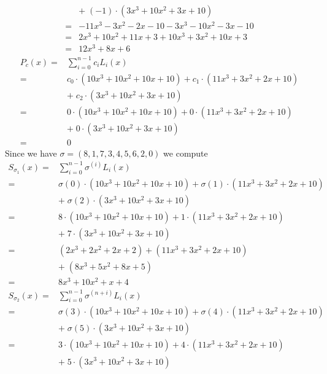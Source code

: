 \begin{example}
$$\begin{array}{rl}
           & +\; (-1)\cdot (3x^3 +10x^2+ 3x + 10)\\
         = & -11x^3 -3x^2 -2x - 10 -3x^3 -10x^2 -3x -10\\  
         = & 2x^3 +10 x^2 +11x +3 +10x^3 +3x^2 +10x +3\\ 
         = & 12x^3  +8x +6           
\end{array}
$$
$$
\begin{array}{rl}
P_{c}(x) = & \sum_{i=0}^{n-1} {c_i}L_i(x)\\         
         = & c_0\cdot (10x^3 + 10 x^2 +10x + 10) + c_1\cdot (11x^3 +3x^2 +2x + 10) \\
           & +\; c_2\cdot (3x^3 +10x^2+ 3x + 10)\\
         = & 0\cdot (10x^3 + 10 x^2 +10x + 10) + 0\cdot (11x^3 +3x^2 +2x + 10) \\
           & +\; 0\cdot (3x^3 +10x^2+ 3x + 10)\\
         = & 0          
\end{array}
$$
Since we have $\sigma = (8,1,7,3,4,5,6,2,0)$ we compute
$$
\begin{array}{rl}
S_{\sigma_1}(x) = & \sum_{i=0}^{n-1} \sigma^(i)L_i(x) \\       
         = & \sigma(0) \cdot (10x^3 + 10 x^2 +10x + 10) 
           + \sigma(1)\cdot (11x^3 +3x^2 +2x + 10) \\
           & +\; \sigma(2)\cdot (3x^3 +10x^2+ 3x + 10)\\
         = & 8 \cdot (10x^3 + 10 x^2 +10x + 10) 
           + 1\cdot (11x^3 +3x^2 +2x + 10) \\
           & +\; 7 \cdot (3x^3 +10x^2+ 3x + 10)\\ 
         = & (2x^3 + 2 x^2 +2x + 2) 
           + (11x^3 +3x^2 +2x + 10) \\
           & +\; (8x^3 +5x^2+ 8x + 5)\\ 
         = & 8x^3 + 10 x^2 + x + 4                     
\end{array}
$$
$$
\begin{array}{rl}
S_{\sigma_2}(x) = & \sum_{i=0}^{n-1} \sigma^(n+i)L_i(x) \\       
         = & \sigma(3) \cdot (10x^3 + 10 x^2 +10x + 10) 
           + \sigma(4)\cdot (11x^3 +3x^2 +2x + 10) \\
           & +\; \sigma(5)\cdot (3x^3 +10x^2+ 3x + 10)\\
         = & 3 \cdot (10x^3 + 10 x^2 +10x + 10) 
           + 4\cdot (11x^3 +3x^2 +2x + 10) \\
           & +\; 5 \cdot (3x^3 +10x^2+ 3x + 10)\\   

\end{array}$$
\end{example}

